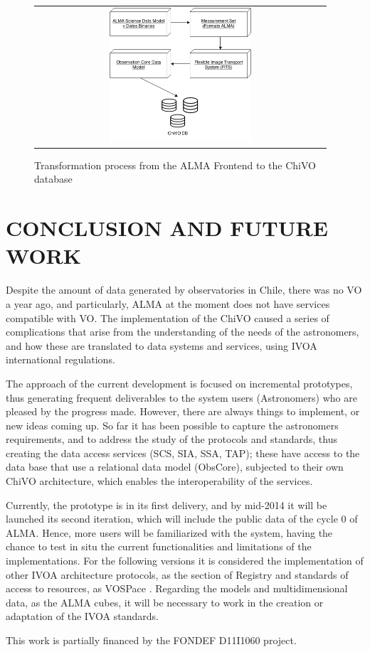 \documentclass[]{spie}
\begin{document}
\begin{figure}
   \begin{center}
   \begin{tabular}{c}
   \includegraphics[width=0.5\textwidth]{images/metadata.png}
   \end{tabular}
   \end{center}
   \caption[example]
   {\label{fig:metadata} Transformation process from the ALMA Frontend to the ChiVO database}
\end{figure}

\section{CONCLUSION AND FUTURE WORK}
Despite the amount of data generated by observatories in Chile, there was no VO
a year ago, and particularly, ALMA at the moment does not have services
compatible with VO. The implementation of the ChiVO caused a series of
complications that arise from the understanding of the needs of the
astronomers, and how these are translated to data systems and services, using
IVOA international regulations.

The approach of the current development is focused on incremental prototypes,
thus generating frequent deliverables to the system users (Astronomers) who are
pleased by the progress made. However, there are always things to implement, or
new ideas coming up. So far it has been possible to capture the astronomers
requirements, and to address the study of the protocols and standards, thus
creating the data access services (SCS, SIA, SSA, TAP); these have access to
the data base that use a relational data model (ObsCore), subjected to their
own ChiVO architecture, which enables the interoperability of the services.

Currently, the prototype is in its first delivery, and by mid-2014 it will be
launched its second iteration, which will include the public data of the cycle
0 of ALMA. Hence, more users will be familiarized with the system, having the
chance to test in situ the current functionalities and limitations of the
implementations.  For the following versions it is considered the
implementation of other IVOA architecture protocols, as the section of Registry
and standards of access to resources, as VOSPace \cite{graham2007vospace}.
Regarding the models and multidimensional data, as the ALMA cubes, it will be
necessary to work in the creation or adaptation of the IVOA standards.

\acknowledgments     %
This work is partially financed by the FONDEF D11I1060 project.
\newpage
\end{document}
